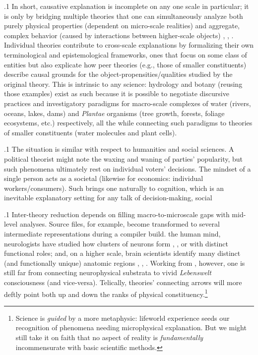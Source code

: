 \documentclass[11pt, twocolumn]{article}
\begin{document}
\p.1{%
\:\+In short, causative explanation is incomplete on any one scale in
particular; it is only by bridging multiple theories that one can
simultaneously analyze both purely physical properties (dependent
on micro-scale realities) and aggregate, complex behavior
(caused by interactions between higher-scale objects)
, , . \> Individual
theories contribute to cross-scale explanations by formalizing
their own terminological and epistemological frameworks, ones
that focus on some class of entities but also explicate how
peer theories (e.g., those of smaller constituents) describe
causal grounds for the object-propensities/qualities studied by
the original theory. \> This is intrinsic to any science: hydrology
and botany (reusing those examples) exist as such because it
is possible to negotiate discursive practices and investigatory paradigms
for macro-scale complexes of water (rivers, oceans, lakes, dams)
and \textit{Plantae} organisms (tree growth, forests, foliage ecosystems, etc.) respectively, all the
while connecting such paradigms to theories of smaller constituents
(water molecules and plant cells).\<\;
} %

\p.1{%
\:\+The situation is similar with respect to humanities and social 
sciences. \> A political theorist might note the waxing and waning of parties' popularity,
but such phenomena ultimately rest on individual voters' 
decisions. \> The mindset of a single person acts as a societal 
(likewise for economics: individual workers/consumers). \> Such brings
one naturally to cognition, which is an inevitable explanatory
setting for any talk of decision-making, social \<\;
} %

\p.1{%
\:\+Inter-theory reduction depends on filling macro-to-microscale gaps with mid-level
analyses. \> Source files, for example,
become transformed to several intermediate representations during a compiler build. \> \Visavis{} the
human mind, neurologists have studied how clusters of neurons
form , , or  with distinct functional roles; and,
on a higher scale, brain scientists identify many distinct
(and functionally unique) anatomic regions ,
, . \> Working from
, however, one is still far from connecting
neurophysical substrata to vivid \textit{Lebenswelt}
consciousness (and vice-versa). \> Telically,
theories' connecting arrows will more deftly point both up and
down the ranks of physical constituency.\<\footnote{\+Science is \textit{guided} by a more
 metaphysic: \label{fn:scienceGuided}lifeworld
experience seeds our
recognition of phenomena needing microphysical explanation. \> But we might still take it on faith that
no aspect of reality is \textit{fundamentally} incommensurate
with basic scientific methods.\<}\;\condenlargepage{2em}
} %
\end{document}
